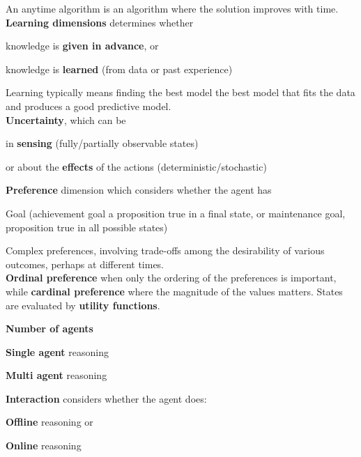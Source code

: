 \documentclass[10pt]{report}
\begin{document}
An anytime algorithm is an algorithm where the solution improves with time.\\
\textbf{Learning dimensions} determines whether \begin{list}{}{}
	\item knowledge is \textbf{given in advance}, or
	\item knowledge is \textbf{learned} (from data or past experience)
\end{list}
Learning typically means finding the best model the best model that fits the data and produces a good predictive model.\\
\textbf{Uncertainty}, which can be \begin{list}{}{}
	\item in \textbf{sensing} (fully/partially observable states)
	\item or about the \textbf{effects} of the actions (deterministic/stochastic)
\end{list}
\textbf{Preference} dimension which considers whether the agent has
\begin{list}{}{}
	\item Goal (achievement goal a proposition true in a final state, or maintenance goal, proposition true in all possible states)
	\item Complex preferences, involving trade-offs among the desirability of various outcomes, perhaps at different times.\\
	\textbf{Ordinal preference} when only the ordering of the preferences is important, while \textbf{cardinal preference} where the magnitude of the values matters. States are evaluated by \textbf{utility functions}.
\end{list}
\pagebreak
\textbf{Number of agents}\begin{list}{}{}
	\item \textbf{Single agent} reasoning
	\item \textbf{Multi agent} reasoning
\end{list}
\textbf{Interaction} considers whether the agent does:
\begin{list}{}{}
	\item \textbf{Offline} reasoning or
	\item \textbf{Online} reasoning
\end{list}
\end{document}
